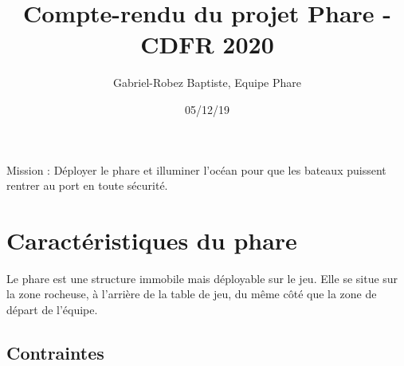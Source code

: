 \documentclass{article}
\title{Compte-rendu du projet Phare - CDFR 2020}
\author{Gabriel-Robez Baptiste, Equipe Phare}
\date{05/12/19}
\begin{document}
\maketitle

Mission : Déployer le phare et illuminer l'océan pour que les bateaux puissent rentrer au port en toute
sécurité.

\section{Caractéristiques du phare}

Le phare est une structure immobile mais déployable sur le jeu. Elle se situe sur la zone rocheuse, à l'arrière
de la table de jeu, du même côté que la zone de départ de l'équipe.

\subsection{Contraintes}
\end{document}
